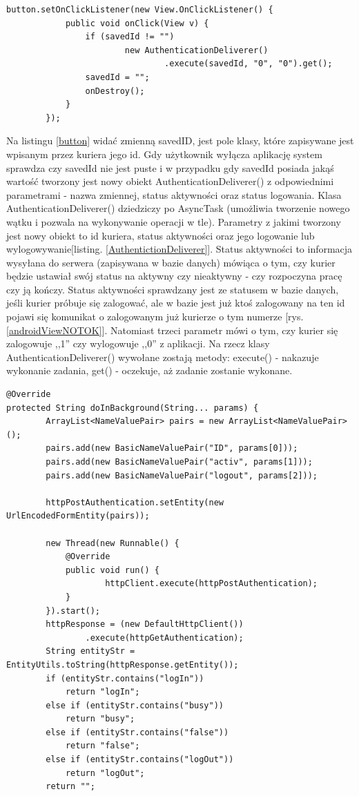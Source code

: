 \documentclass[eng,printmode,oneside]{mgr}
\begin{document}
\begin{lstlisting}[caption=Ustawienie właściwości przycisku
``Off'',label=button]
button.setOnClickListener(new View.OnClickListener() {
			public void onClick(View v) {
				if (savedId != "")
						new AuthenticationDeliverer()
								.execute(savedId, "0", "0").get();
				savedId = "";
				onDestroy();
			}
		});
\end{lstlisting}

Na listingu \ref{button} widać zmienną savedID, jest pole klasy, które
zapisywane jest wpisanym przez kuriera jego id. Gdy użytkownik wyłącza aplikację
system sprawdza czy savedId nie jest puste i w przypadku gdy savedId posiada
jakąś wartość tworzony jest nowy obiekt AuthenticationDeliverer() z odpowiednimi
parametrami - nazwa zmiennej, status aktywności oraz status logowania. Klasa
AuthenticationDeliverer() dziedziczy po AsyncTask (umożliwia tworzenie nowego
wątku i pozwala na wykonywanie operacji w tle). Parametry z jakimi tworzony jest
nowy obiekt to id kuriera, status aktywności oraz jego logowanie lub
wylogowywanie[listing. \ref{AuthentictionDeliverer}]. Status aktywności to informacja
wysyłana do serwera (zapisywana w bazie danych) mówiąca o tym, czy kurier będzie ustawiał swój status na aktywny
czy nieaktywny - czy rozpoczyna pracę czy ją kończy. Status aktywności
sprawdzany jest ze statusem w bazie danych, jeśli kurier próbuje się zalogować,
ale w bazie jest już ktoś zalogowany na ten id pojawi się komunikat o
zalogowanym już kurierze o tym numerze [rys. \ref{androidViewNOTOK}]. Natomiast
trzeci parametr mówi o tym, czy kurier się zalogowuje ,,1'' czy wylogowuje ,,0''
z aplikacji. Na rzecz klasy AuthenticationDeliverer() wywołane zostają metody:
execute() - nakazuje wykonanie zadania, get() - oczekuje, aż zadanie zostanie
wykonane.

\begin{lstlisting}[caption=klasa
AuthenticationDeliverer metoda doInBackground,label=AuthentictionDeliverer]
@Override 
protected String doInBackground(String... params) {
		ArrayList<NameValuePair> pairs = new ArrayList<NameValuePair>();
		pairs.add(new BasicNameValuePair("ID", params[0]));
		pairs.add(new BasicNameValuePair("activ", params[1]));
		pairs.add(new BasicNameValuePair("logout", params[2]));

		httpPostAuthentication.setEntity(new UrlEncodedFormEntity(pairs));
		
		new Thread(new Runnable() {
			@Override
			public void run() {
					httpClient.execute(httpPostAuthentication);
			}
		}).start();
		httpResponse = (new DefaultHttpClient())
				.execute(httpGetAuthentication);
		String entityStr = EntityUtils.toString(httpResponse.getEntity());
		if (entityStr.contains("logIn"))
			return "logIn";
		else if (entityStr.contains("busy"))
			return "busy";
		else if (entityStr.contains("false"))
			return "false";
		else if (entityStr.contains("logOut"))
			return "logOut";
		return "";
\end{lstlisting}
\end{document}
